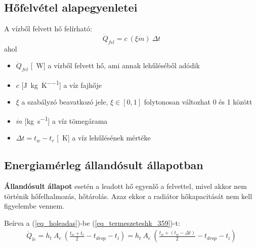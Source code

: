 %
%
%
%
\subsection{Hőfelvétel alapegyenletei}
A vízből felvett hő felírható:
\begin{equation} \label{eq_hofelvetel}
\dot Q_{fel} = c ~ (\xi\dot{m}) ~ \Delta t
\end{equation}
ahol
\begin{itemize}[itemsep=6pt,topsep=0pt,parsep=0pt,partopsep=0pt]
	\item[] $\dot{Q}_{fel}$ [\SI{}{\watt}] a vízből felvett hő, ami annak lehűléséből adódik
	\item[] $c$ [\si[per-mode = fraction]{\joule\per\kg\per\kelvin}] a víz fajhője
	\item[] $\xi$ a szabályzó beavatkozó jele, $ \xi \in [0,1]$ folytonosan változhat 0 és 1 között
	\item[] $\dot{m}$ [\si[per-mode = fraction]{\kg\per\second}] a víz tömegárama
	\item[] $\Delta t = t_w-t_r$ [\SI{}{\kelvin}] a víz lehűlésének mértéke
\end{itemize}

\subsection{Energiamérleg állandósult állapotban}
\textbf{Állandósult állapot} esetén a leadott hő egyenlő a felvettel, mivel akkor nem történik hőfelhalmozás, hőtárolás.
Azaz ekkor a radiátor hőkapacitását nem kell figyelembe vennem.

Beírva a (\ref{eq_holeadas})-be (\ref{eq_termeszeteshk_359})-t:
\begin{equation} \label{eq_holeadas2}
\begin{aligned}
\dot Q_{le} = h_t ~ A_e ~ \left( \frac{t_w+t_r}{2}-t_{drop} - t_i\right) = h_t ~ A_e ~ \left( \frac{t_w+(t_w-\Delta t)}{2}-t_{drop}-t_i\right)
\end{aligned}
\end{equation}

